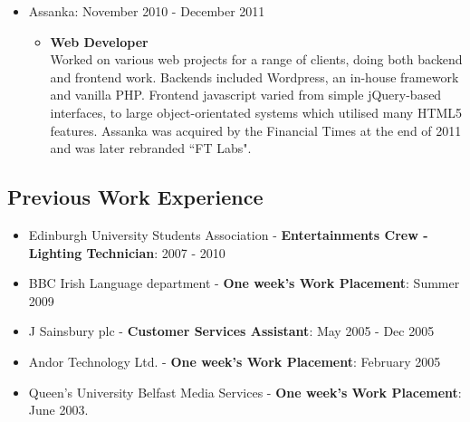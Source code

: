 \documentclass[a4paper]{article}
\begin{document}
\begin{itemize}
\item Assanka: November 2010 - December 2011
\begin{itemize}\item
 {\bf Web Developer}\\
Worked on various web projects for a range of clients, doing both backend and frontend work. Backends included Wordpress, an in-house framework and vanilla PHP. Frontend javascript varied from simple jQuery-based interfaces, to large object-orientated systems which utilised many HTML5 features.
Assanka was acquired by the Financial Times at the end of 2011 and was later rebranded ``FT Labs".
\end{itemize}

\end{itemize}

\subsection*{Previous Work Experience}
\begin{itemize}

\item Edinburgh University Students Association - {\bf Entertainments Crew - Lighting Technician}: 2007 - 2010
\item BBC Irish Language department - {\bf One week's Work Placement}: Summer 2009
\item J Sainsbury plc - {\bf Customer Services Assistant}: May 2005 - Dec 2005
\item Andor Technology Ltd. - {\bf One week's Work Placement}:  February 2005
\item Queen's University Belfast Media Services - {\bf One week's Work Placement}:  June 2003.


\end{itemize}
\end{document}
